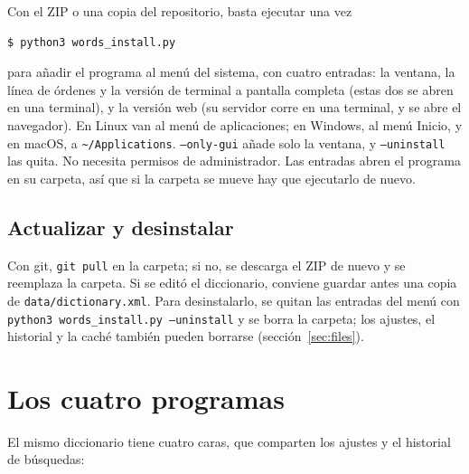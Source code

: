 \documentclass[12pt,
              article,
              oneside
              ]{memoir}
\begin{document}
%
Con el ZIP o una copia del repositorio, basta ejecutar una vez

\begin{verbatim}
$ python3 words_install.py
\end{verbatim}

\noindent
para añadir el programa al menú del sistema, con cuatro entradas: la
ventana, la línea de órdenes y la versión de terminal a pantalla completa
(estas dos se abren en una terminal), y la versión web (su servidor corre
en una terminal, y se abre el navegador). En Linux van al menú de
aplicaciones; en Windows, al menú Inicio, y en macOS, a
\texttt{\textasciitilde/Applications}. \texttt{--only-gui} añade solo la
ventana, y \texttt{--uninstall} las quita. No necesita permisos de
administrador. Las entradas abren el programa en su carpeta, así que si la
carpeta se mueve hay que ejecutarlo de nuevo.

\subsection{Actualizar y desinstalar}

%
Con git, \texttt{git pull} en la carpeta; si no, se descarga el ZIP de
nuevo y se reemplaza la carpeta. Si se editó el diccionario, conviene
guardar antes una copia de \texttt{data/dictionary.xml}. Para
desinstalarlo, se quitan las entradas del menú con \texttt{python3
words\_install.py --uninstall} y se borra la carpeta; los ajustes, el
historial y la caché también pueden borrarse (sección~\ref{sec:files}).

\section{Los cuatro programas}
\label{sec:programs}

%
El mismo diccionario tiene cuatro caras, que comparten los ajustes y el
historial de búsquedas:
\end{document}
